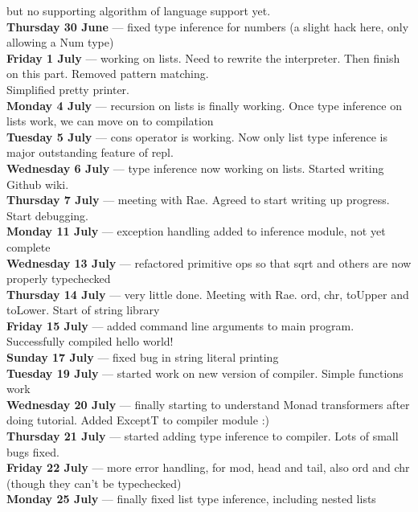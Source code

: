                     but no supporting algorithm of language support yet. \\
\textbf{Thursday 30 June}  --- fixed type inference for numbers (a slight hack here, only allowing a Num type) \\
\textbf{Friday 1 July}  --- working on lists. Need to rewrite the interpreter. Then finish on this part. Removed pattern matching.  \\
                    Simplified pretty printer. \\
\textbf{Monday 4 July}  --- recursion on lists is finally working. Once type inference on lists work, we can move on to compilation \\
\textbf{Tuesday 5 July}  --- cons operator is working. Now only list type inference is major outstanding feature of repl. \\
\textbf{Wednesday 6 July}  --- type inference now working on lists. Started writing Github wiki. \\
\textbf{Thursday 7 July}  --- meeting with Rae. Agreed to start writing up progress. Start debugging. \\
\textbf{Monday 11 July}  --- exception handling added to inference module, not yet complete \\
\textbf{Wednesday 13 July}  --- refactored primitive ops so that sqrt and others are now properly typechecked \\
\textbf{Thursday 14 July}  --- very little done. Meeting with Rae. ord, chr, toUpper and toLower. Start of string library \\
\textbf{Friday 15 July}  --- added command line arguments to main program. Successfully compiled hello world! \\
\textbf{Sunday 17 July}  --- fixed bug in string literal printing \\
\textbf{Tuesday 19 July}  --- started work on new version of compiler. Simple functions work \\
\textbf{Wednesday 20 July}  --- finally starting to understand Monad transformers after doing
tutorial. Added ExceptT to compiler module :) \\
\textbf{Thursday 21 July}  --- started adding type inference to compiler. Lots of small bugs fixed. \\
\textbf{Friday 22 July}  --- more error handling, for mod, head and tail, also ord and chr (though they can't be typechecked) \\
\textbf{Monday 25 July}  --- finally fixed list type inference, including nested lists \\
